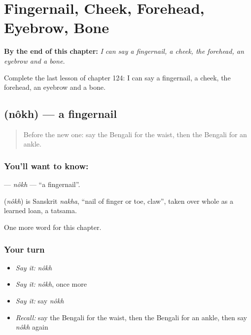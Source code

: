
\chapter{Fingernail, Cheek, Forehead, Eyebrow, Bone}
\label{ch:bn-fingernail-cheek-forehead-eyebrow-bone}

\begin{chapteropening}
\textbf{By the end of this chapter:} \emph{I can say a fingernail, a cheek, the forehead, an eyebrow and a bone.}

Complete the last lesson of chapter 124: I can say a fingernail, a cheek, the forehead, an eyebrow and a bone.
\end{chapteropening}

\section[\texorpdfstring{\bn{নখ} (nôkh)}{নখ (nôkh)}]{ (nôkh) — a fingernail}

\label{lesson:BN-C124-nokh}



\begin{quote}
Before the new one: say the Bengali for the waist, then the Bengali for an ankle.
\end{quote}

\subsection*{You'll want to know: }
\textbf{} — \emph{nôkh} — \textquotedblleft{}a fingernail\textquotedblright{}.

\begin{cousinweb}
\textbf{} (\emph{nôkh}) is Sanskrit \emph{nakha}, \textquotedblleft{}nail of finger or toe, claw\textquotedblright{}, taken over whole as a learned loan, a tatsama.
\end{cousinweb}

\begin{grammarlens}[title={What you've built}]
One more word for this chapter.
\end{grammarlens}

\subsection*{Your turn}
\begin{itemize}
\raggedright
  \item \emph{Say it:} \emph{nôkh}
  \item \emph{Say it:} \emph{nôkh}, once more
  \item \emph{Say it:} say \emph{nôkh}
  \item \emph{Recall:} say the Bengali for the waist, then the Bengali for an ankle, then say \emph{nôkh} again
\end{itemize}

